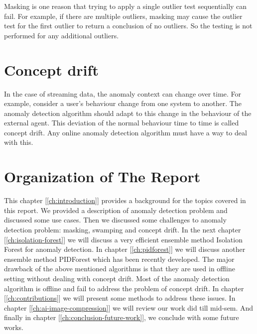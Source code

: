 Masking is one reason that trying to apply a single outlier test sequentially can fail.
For example, if there are multiple outliers, masking may cause the outlier test for the first outlier to return a conclusion of no outliers.
So the testing is not performed for any additional outliers.

\section{Concept drift}
\label{sec:concept-drift-definition}

In the case of streaming data, the anomaly context can change over time.
For example, consider a user's behaviour change from one system to another.
The anomaly detection algorithm should adapt to this change in the behaviour of the external agent.
This deviation of the normal behaviour time to time is called concept drift.
Any online anomaly detection algorithm must have a way to deal with this.


\section{Organization of The Report}
\label{sec:organization-of-the-report}

This chapter [\ref{ch:introduction}] provides a background for the topics covered in this report.
We provided a description of anomaly detection problem and discussed some use cases.
Then we discussed some challenges to anomaly detection problem: masking, swamping and concept drift.
In the next chapter [\ref{ch:isolation-forest}] we will discuss a very efficient ensemble method Isolation Forest for anomaly detection.
In chapter [\ref{ch:pidforest}] we will discuss another ensemble method PIDForest which has been recently developed.
The major drawback of the above mentioned algorithms is that they are used in offline setting without dealing with concept drift.
Most of the anomaly detection algorithm is offline and fail to address the problem of concept drift.
In chapter [\ref{ch:contributions}] we will present some methods to address these issues.
In chapter [\ref{ch:ai-image-compression}] we will review our work did till mid-sem.
And finally in chapter [\ref{ch:conclusion-future-work}], we conclude with some future works.

